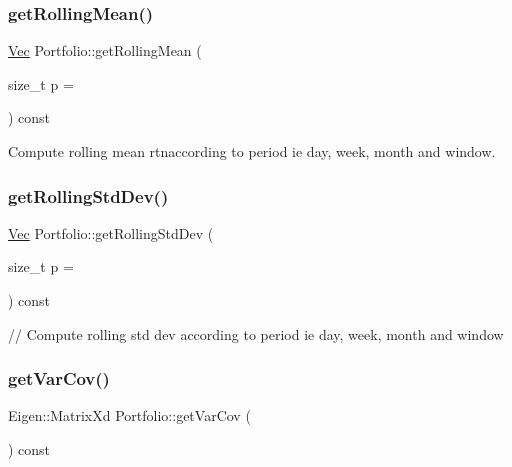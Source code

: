 \subsubsection{\texorpdfstring{get\+Rolling\+Mean()}{getRollingMean()}}
{\footnotesize\ttfamily \hyperlink{compute__returns__eigen_8h_a1eb6a9306ef406d7975f3cbf2e247777}{Vec} Portfolio\+::get\+Rolling\+Mean (\begin{DoxyParamCaption}\item[{size\+\_\+t}]{p = {} }\end{DoxyParamCaption}) const}



Compute rolling mean rtnaccording to period ie day, week, month and window. 

\hypertarget{classPortfolio_a9833a33a238b2416e7c2c4f19ff7be8e}{}\label{classPortfolio_a9833a33a238b2416e7c2c4f19ff7be8e} 
\subsubsection{\texorpdfstring{get\+Rolling\+Std\+Dev()}{getRollingStdDev()}}
{\footnotesize\ttfamily \hyperlink{compute__returns__eigen_8h_a1eb6a9306ef406d7975f3cbf2e247777}{Vec} Portfolio\+::get\+Rolling\+Std\+Dev (\begin{DoxyParamCaption}\item[{size\+\_\+t}]{p = {} }\end{DoxyParamCaption}) const}



// Compute rolling std dev according to period ie day, week, month and window 

\hypertarget{classPortfolio_adc5f7b744cacda38f442277d60ab77a0}{}\label{classPortfolio_adc5f7b744cacda38f442277d60ab77a0} 
\subsubsection{\texorpdfstring{get\+Var\+Cov()}{getVarCov()}}
{\footnotesize\ttfamily Eigen\+::\+Matrix\+Xd Portfolio\+::get\+Var\+Cov (\begin{DoxyParamCaption}{ }\end{DoxyParamCaption}) const\hspace{0.3cm}{\ttfamily [inline]}}

